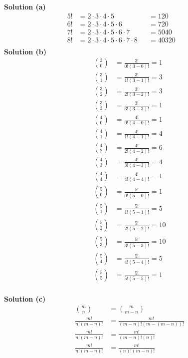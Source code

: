 \documentclass[6pt]{article}
\begin{document}
\textbf{Solution (a)}
\begin{align*}
5! &= 2 \cdot 3 \cdot 4 \cdot 5 &&= 120 &&& \\
6! &= 2 \cdot 3 \cdot 4 \cdot 5 \cdot 6 &&= 720 &&& \\
7! &= 2 \cdot 3 \cdot 4 \cdot 5 \cdot 6 \cdot 7 &&= 5040 &&& \\
8! &= 2 \cdot 3 \cdot 4 \cdot 5 \cdot 6 \cdot 7 \cdot 8 &&= 40320 &&& \\
\end{align*}
\textbf{Solution (b)}
\begin{align*}
\binom{3}{0} &= \frac{3!}{0!(3 - 0)!} = 1 \\
\binom{3}{1} &= \frac{3!}{1!(3 - 1)!} = 3 \\
\binom{3}{2} &= \frac{3!}{2!(3 - 2)!} = 3 \\
\binom{3}{3} &= \frac{3!}{3!(3 - 3)!} = 1 \\
\binom{4}{0} &= \frac{4!}{0!(4 - 0)!} = 1 \\
\binom{4}{1} &= \frac{4!}{1!(4 - 1)!} = 4 \\
\binom{4}{2} &= \frac{4!}{2!(4 - 2)!} = 6 \\
\binom{4}{3} &= \frac{4!}{3!(4 - 3)!} = 4 \\
\binom{4}{4} &= \frac{4!}{4!(4 - 4)!} = 1 \\
\binom{5}{0} &= \frac{5!}{0!(5 - 0)!} = 1 \\
\binom{5}{1} &= \frac{5!}{1!(5 - 1)!} = 5 \\
\binom{5}{2} &= \frac{5!}{2!(5 - 2)!} = 10 \\
\binom{5}{3} &= \frac{5!}{3!(5 - 3)!} = 10 \\
\binom{5}{4} &= \frac{5!}{4!(5 - 4)!} = 5 \\
\binom{5}{5} &= \frac{5!}{5!(5 - 5)!} = 1 \\
\end{align*}


\textbf{Solution (c)}
\begin{align*}
\binom{m}{n} &= \binom{m}{m - n} \\
\frac{m!}{n!(m - n)!} &= \frac{m!}{(m-n)!(m - (m - n))!} \\
\frac{m!}{n!(m - n)!} &= \frac{m!}{(m-n)!(n)!} \\
\frac{m!}{n!(m - n)!} &= \frac{m!}{(n)!(m-n)!} \\
\end{align*}
\end{document}
